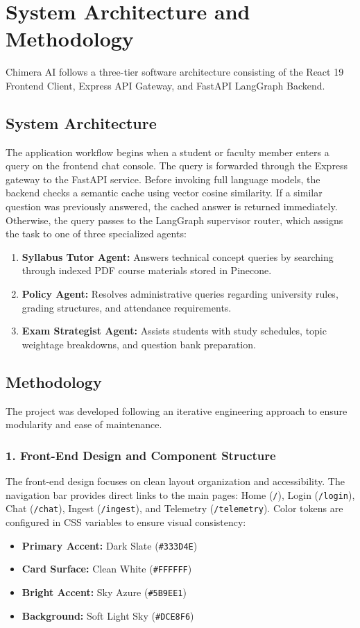 \chapter{System Architecture and Methodology}

Chimera AI follows a three-tier software architecture consisting of the React 19 Frontend Client, Express API Gateway, and FastAPI LangGraph Backend.

\section{System Architecture}
The application workflow begins when a student or faculty member enters a query on the frontend chat console. The query is forwarded through the Express gateway to the FastAPI service. Before invoking full language models, the backend checks a semantic cache using vector cosine similarity. If a similar question was previously answered, the cached answer is returned immediately. Otherwise, the query passes to the LangGraph supervisor router, which assigns the task to one of three specialized agents:
\begin{enumerate}
    \item \textbf{Syllabus Tutor Agent:} Answers technical concept queries by searching through indexed PDF course materials stored in Pinecone.
    \item \textbf{Policy Agent:} Resolves administrative queries regarding university rules, grading structures, and attendance requirements.
    \item \textbf{Exam Strategist Agent:} Assists students with study schedules, topic weightage breakdowns, and question bank preparation.
\end{enumerate}

\section{Methodology}
The project was developed following an iterative engineering approach to ensure modularity and ease of maintenance.

\subsection{1. Front-End Design and Component Structure}
The front-end design focuses on clean layout organization and accessibility. The navigation bar provides direct links to the main pages: Home (\texttt{/}), Login (\texttt{/login}), Chat (\texttt{/chat}), Ingest (\texttt{/ingest}), and Telemetry (\texttt{/telemetry}). Color tokens are configured in CSS variables to ensure visual consistency:
\begin{itemize}
    \item \textbf{Primary Accent:} Dark Slate (\texttt{\#333D4E})
    \item \textbf{Card Surface:} Clean White (\texttt{\#FFFFFF})
    \item \textbf{Bright Accent:} Sky Azure (\texttt{\#5B9EE1})
    \item \textbf{Background:} Soft Light Sky (\texttt{\#DCE8F6})
\end{itemize}

